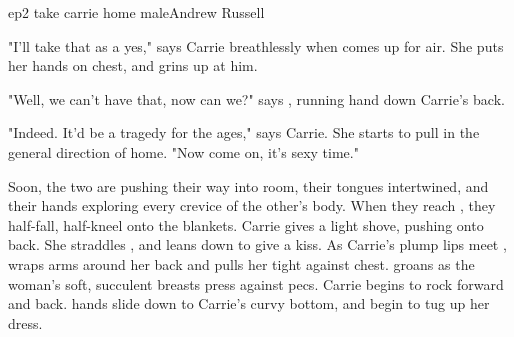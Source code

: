 \documentclass{book}
\begin{document}
\begin{childnode}{ep2 take carrie home male}{Andrew Russell}

    "I'll take that as a yes," says Carrie breathlessly when \name{} comes up for air. She puts her hands on \names{} chest, and grins up at him. 

    {"Well, we can't have that, now can we?" says \name{}, running \hisher{} hand down Carrie's back.} %

    {"Indeed. It'd be a tragedy for the ages," says Carrie. She starts to pull \name{} in the general direction of \hisher{} home. "Now come on, it's sexy time."}



    Soon, the two are pushing their way into \names{} room, their tongues intertwined, and their hands exploring every crevice of the other's body. When they reach \names{}
    , they half-fall, half-kneel onto the blankets. Carrie gives \name{} a light shove, pushing \himher{} onto \hisher{} back. She straddles \himher{}, 
    and leans down to give \himher{} a kiss.
    As Carrie's plump lips meet \hishers{}, \name{} wraps \hisher{} arms around her back and pulls her tight against \hisher{} chest. \HeShe{} groans as the woman's soft, succulent breasts press 
    against
    \hisher{}  pecs. Carrie begins to rock forward and back. \names{} hands slide down to Carrie's curvy bottom, and begin to tug up her dress. 


\end{childnode}
\end{document}
